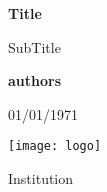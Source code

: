 \begin{titlepage}
    \begin{center}
        \vspace*{1cm}

        \Huge
        \textbf{Title}

        \vspace{.5cm}
        \LARGE
        SubTitle

        \vspace{1cm}

        \textbf{authors}

        \vspace{.2cm}
        \Large
        01/01/1971

        \vspace{2cm}
        \texttt{[image: logo]}

        \vfill

        Institution\\

    \end{center}
\end{titlepage}

